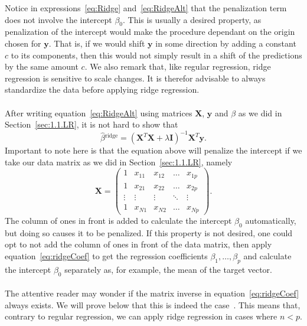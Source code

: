 Notice in expressions~\eqref{eq:Ridge} and~\eqref{eq:RidgeAlt} that the penalization term does not involve the intercept $\beta_0$. This is usually a desired property, as penalization of the intercept would make the procedure dependant on the origin chosen for $\textbf{y}$. That is, if we would shift $\textbf{y}$ in some direction by adding a constant $c$ to its components, then this would not simply result in a shift of the predictions by the same amount $c$. We also remark that, like regular regression, ridge regression is sensitive to scale changes. It is therefor advisable to always standardize the data before applying ridge regression.\\
\\
After writing equation~\eqref{eq:RidgeAlt} using matrices $\textbf{X}$, $\textbf{y}$ and $\beta$ as we did in Section~\ref{sec:1.1.LR}, it is not hard to show that
 \begin{equation} \label{eq:ridgeCoef}
    \hat{\beta}{}^{\textrm{ridge}} = (\textbf{X}^T\textbf{X} + \lambda\textbf{I})^{-1}\textbf{X}^T\textbf{y}.
\end{equation}
Important to note here is that the equation above will penalize the intercept if we take our data matrix as we did in Section~\ref{sec:1.1.LR}, namely
\begin{equation*}
    \textbf{X} = \begin{pmatrix}
    1 & x_{11} & x_{12} & \dots & x_{1p}\\
    1 & x_{21} & x_{22} & \dots & x_{2p}\\
    \vdots & \vdots & \vdots & \ddots & \vdots\\
    1 & x_{N1} & x_{N2} & \dots & x_{Np}
    \end{pmatrix}.
\end{equation*}
The column of ones in front is added to calculate the intercept $\beta_0$ automatically, but doing so causes it to be penalized. If this property is not desired, one could opt to not add the column of ones in front of the data matrix, then apply equation~\eqref{eq:ridgeCoef} to get the regression coefficients $\beta_1, \dots, \beta_p$ and calculate the intercept $\beta_0$ separately as, for example, the mean of the target vector.\\
\\
The attentive reader may wonder if the matrix inverse in equation~\eqref{eq:ridgeCoef} always exists. We will prove below that this is indeed the case~\cite{Kj2018}. This means that, contrary to regular regression, we can apply ridge regression in cases where $n < p$.\\
